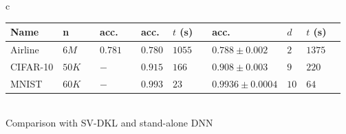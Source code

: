 \documentclass[a0,portrait]{a0poster}
\begin{document}
\begin{multicols}{2}
\begin{center}
{\begin{tabular}{c}
\begin{tabular}{lll ll llll lll}
      Name & n &&
      acc. && acc. & $t$ (s) &&
      acc. & $d$ & $t$ (s)
      \\
      \midrule



      Airline & $6M$ && 
      $0.781$ && $0.780$ & $1055$ &&
      $\mathbf{0.788 \pm 0.002}$ & $2$ & $1375$\\

      CIFAR-10 & $50 K$ && 
      $-$ && $\mathbf{0.915}$ & $166$ &&
      $0.908 \pm 0.003$ & $9$ & $220$\\

      MNIST & $60K$ && 
      $-$ && $0.993$ & $23$ &&
      $\mathbf{0.9936 \pm 0.0004}$ & $10$ & $64$\\
      \bottomrule
    \end{tabular}
  \\
  Comparison with SV-DKL \citep{wilson2016stochastic} and stand-alone
  DNN

\end{tabular}
}
\end{center}






\end{multicols}
\end{document}
